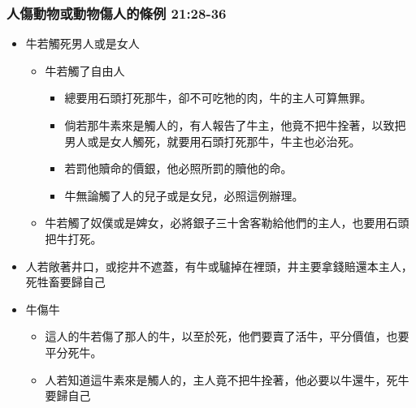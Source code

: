 \subsubsection{人傷動物或動物傷人的條例 21:28-36}
\begin{itemize} 
\itemsep-.35em
\item 牛若觸死男人或是女人
\begin{itemize} 
\itemsep-.35em
\item 牛若觸了自由人
\begin{itemize} 
\itemsep-.35em
\item 總要用石頭打死那牛，卻不可吃牠的肉，牛的主人可算無罪。
\item 倘若那牛素來是觸人的，有人報告了牛主，他竟不把牛拴著，以致把男人或是女人觸死，就要用石頭打死那牛，牛主也必治死。
\item 若罰他贖命的價銀，他必照所罰的贖他的命。
\item 牛無論觸了人的兒子或是女兒，必照這例辦理。
\end{itemize}
\item 牛若觸了奴僕或是婢女，必將銀子三十舍客勒給他們的主人，也要用石頭把牛打死。
\end{itemize}
\item 人若敞著井口，或挖井不遮蓋，有牛或驢掉在裡頭，井主要拿錢賠還本主人，死牲畜要歸自己
\item 牛傷牛
\begin{itemize} 
\itemsep-.35em
\item 這人的牛若傷了那人的牛，以至於死，他們要賣了活牛，平分價值，也要平分死牛。 \item 人若知道這牛素來是觸人的，主人竟不把牛拴著，他必要以牛還牛，死牛要歸自己
\end{itemize}
\end{itemize}

